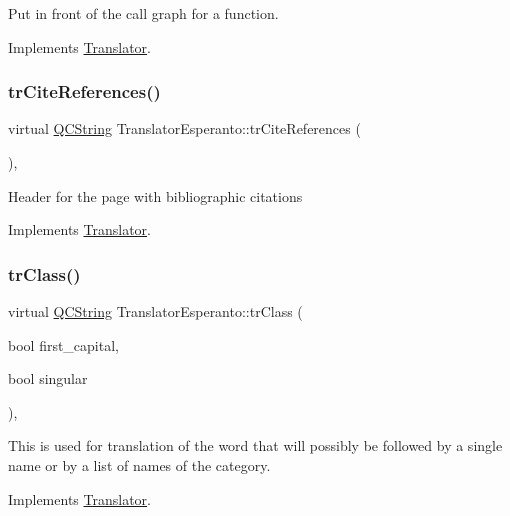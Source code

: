 Put in front of the call graph for a function. 

Implements \mbox{\hyperlink{class_translator}{Translator}}.

\mbox{\label{class_translator_esperanto_a3f1000ae8776cc92805ad7321bc466f7}} 
\subsubsection{\texorpdfstring{trCiteReferences()}{trCiteReferences()}}
{\footnotesize\ttfamily virtual \mbox{\hyperlink{class_q_c_string}{Q\+C\+String}} Translator\+Esperanto\+::tr\+Cite\+References (\begin{DoxyParamCaption}{ }\end{DoxyParamCaption})\hspace{0.3cm}{\ttfamily [inline]}, {\ttfamily [virtual]}}

Header for the page with bibliographic citations 

Implements \mbox{\hyperlink{class_translator}{Translator}}.

\mbox{\label{class_translator_esperanto_a893e5c3f579754e4b2ed35dbb3e651fd}} 
\subsubsection{\texorpdfstring{trClass()}{trClass()}}
{\footnotesize\ttfamily virtual \mbox{\hyperlink{class_q_c_string}{Q\+C\+String}} Translator\+Esperanto\+::tr\+Class (\begin{DoxyParamCaption}\item[{bool}]{first\+\_\+capital,  }\item[{bool}]{singular }\end{DoxyParamCaption})\hspace{0.3cm}{\ttfamily [inline]}, {\ttfamily [virtual]}}

This is used for translation of the word that will possibly be followed by a single name or by a list of names of the category. 

Implements \mbox{\hyperlink{class_translator}{Translator}}.

